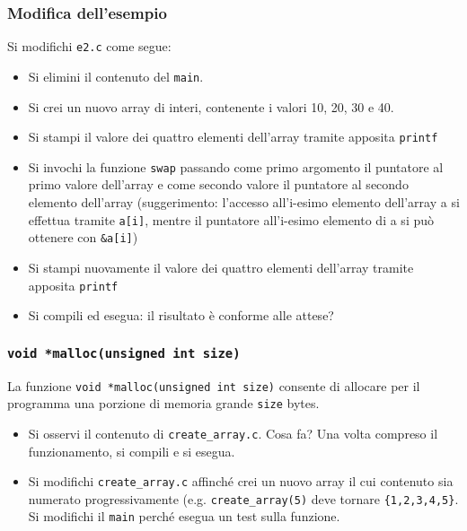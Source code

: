 \documentclass{beamer}
\begin{document}
\begin{frame}
\frametitle{Modifica dell'esempio}
Si modifichi \texttt{e2.c} come segue:
\begin{itemize}
 \item Si elimini il contenuto del \texttt{main}.
 \item Si crei un nuovo array di interi, contenente i valori 10, 20, 30 e 40.
 \item Si stampi il valore dei quattro elementi dell'array tramite apposita \texttt{printf}
 \item Si invochi la funzione \texttt{swap} passando come primo argomento il puntatore al primo valore dell'array e come secondo valore il puntatore al secondo elemento dell'array (suggerimento: l'accesso all'i-esimo elemento dell'array a si effettua tramite \texttt{a[i]}, mentre il puntatore all'i-esimo elemento di a si può ottenere con \texttt{\&a[i]})
 \item Si stampi nuovamente il valore dei quattro elementi dell'array tramite apposita \texttt{printf}
 \item Si compili ed esegua: il risultato è conforme alle attese?
\end{itemize}
\end{frame}

\begin{frame}
\frametitle{\texttt{void *malloc(unsigned int size)}}
La funzione \texttt{void *malloc(unsigned int size)} consente di allocare per il programma una porzione di memoria grande \texttt{size} bytes.
\begin{itemize}
 \item Si osservi il contenuto di \texttt{create\_array.c}. Cosa fa? Una volta compreso il funzionamento, si compili e si esegua.
 \item Si modifichi \texttt{create\_array.c} affinché crei un nuovo array il cui contenuto sia numerato progressivamente (e.g. \texttt{create\_array(5)} deve tornare \texttt{\{1,2,3,4,5\}}. Si modifichi il \texttt{main} perché esegua un test sulla funzione.
\end{itemize}
\end{frame}
\end{document}
